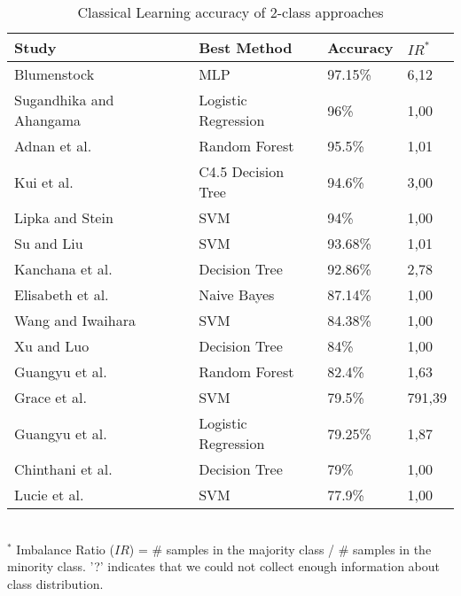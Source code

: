 \begin{table}[ht]
    \caption{Classical Learning accuracy of 2-class approaches}
    \label{tab:CL_performance_2class}
    \centering
    \begin{tabular}{l l l l}
        \toprule
        \textbf{Study} & \textbf{Best Method} & \textbf{Accuracy} & \textbf{$IR^*$}\\ 
        \midrule
        Blumenstock~\cite{Blumenstock2008_lr4} & MLP & 97.15\% & 6,12 \\
        Sugandhika and Ahangama~\cite{Sugandhika2022_lr119} & Logistic Regression & 96\% & 1,00 \\
        Adnan et al.~\cite{Yahya2020_lr2011} & Random Forest & 95.5\% & 1,01 \\
        Kui et al.~\cite{Xiao2013_lr2030} & C4.5 Decision Tree & 94.6\% & 3,00 \\
        Lipka and Stein~\cite{Lipka2010_lr1019} & SVM & 94\% & 1,00 \\
        Su and Liu~\cite{Su2015_lr128} & SVM & 93.68\% & 1,01 \\
        Kanchana et al.~\cite{Saengthongpattana2018_lr150} & Decision Tree & 92.86\% & 2,78 \\
        Elisabeth et al.~\cite{Lex2012_lr1026} & Naive Bayes & 87.14\% & 1,00 \\
        Wang and Iwaihara~\cite{Wang2010_lr70} & SVM & 84.38\% & 1,00 \\
        Xu and Luo~\cite{Xu2011_lr30} & Decision Tree & 84\% & 1,00 \\
        Guangyu et al.~\cite{Wu2012_lr1021} & Random Forest & 82.4\% & 1,63 \\
        Grace et al.~\cite{Betancourt2016_lr95} & SVM & 79.5\% & 791,39 \\
        Guangyu et al.~\cite{Wu2011_lr1030} & Logistic Regression & 79.25\% & 1,87 \\
        Chinthani et al.~\cite{Sugandhika2021_lr1041} & Decision Tree & 79\% & 1,00 \\
        Lucie et al.~\cite{Flekova2014_lr36} & SVM & 77.9\% & 1,00 \\
        \bottomrule
    \end{tabular}
    \\ \vspace{0.1cm}
    \footnotesize
    $^*$ Imbalance Ratio ($IR$) = \# samples in the majority class / \# samples in the minority class. '?' indicates that we could not collect enough information about class distribution.
\end{table}